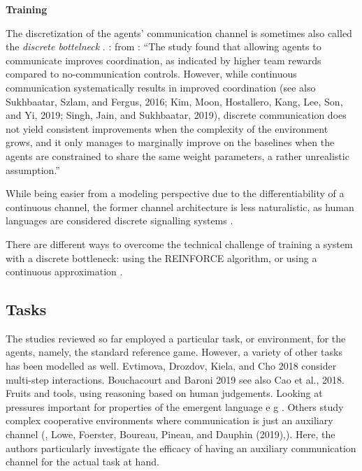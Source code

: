 \textbf{Training}


The discretization of the agents' communication channel is sometimes also called the \textit{discrete bottelneck} \parencite{lazaridou2020multi}. \parencite{foerster2016learning}: from \cite{lazaridou2020multi}: ``The study found that allowing agents to communicate improves coordination, as indicated by higher team rewards compared to no-communication controls. However, while continuous communication systematically results in improved coordination (see also Sukhbaatar, Szlam, and Fergus, 2016; Kim, Moon, Hostallero, Kang, Lee, Son, and Yi, 2019; Singh, Jain, and Sukhbaatar, 2019), discrete communication does not yield consistent improvements when the complexity of the environment grows, and it only manages to marginally improve on the baselines when the agents are constrained to share the same weight parameters, a rather unrealistic assumption.''

While being easier from a modeling perspective due to the differentiability of a continuous channel, the former channel architecture is less naturalistic, as human languages are considered discrete signalling systems \parencite{hockett1960origin}. 

There are different ways to overcome the technical challenge of training a system with a discrete bottleneck: using the REINFORCE algorithm, or using a continuous approximation \cite{havrylov2017emergence}. 

\subsection{Tasks}

The studies reviewed so far employed a particular  task, or environment, for the agents, namely, the standard reference game. However, a variety of other tasks has been modelled as well.
Evtimova, Drozdov, Kiela, and Cho 2018 consider multi-step interactions. Bouchacourt and Baroni 2019 see also Cao et al., 2018. Fruits and tools, using reasoning based on human judgements.
Looking at pressures important for properties of the emergent language e g  \parencite{bouchacourt2018agents}. 
Others study complex cooperative environments where communication is just an auxiliary channel (\parencite{das2019tarmac}, Lowe, Foerster, Boureau, Pineau, and Dauphin (2019),). Here, the authors particularly investigate the efficacy of having an auxiliary communication channel for the actual task at hand.

